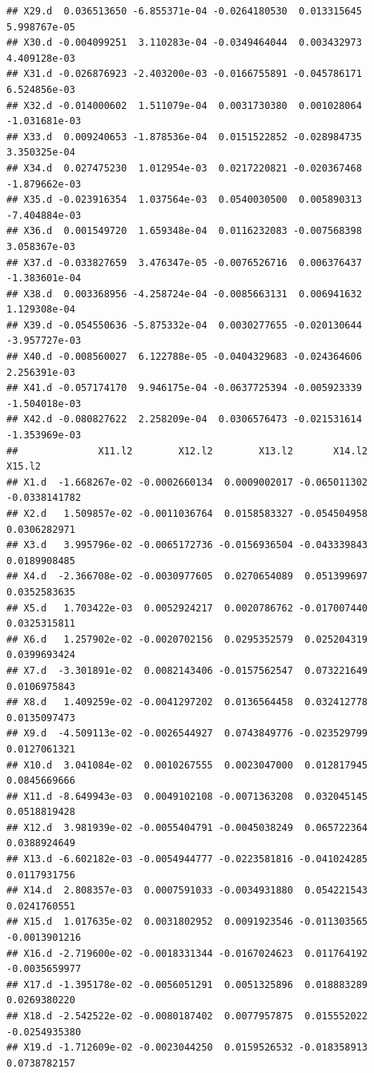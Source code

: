 \documentclass[]{article}
\begin{document}
\begin{verbatim}
## X29.d  0.036513650 -6.855371e-04 -0.0264180530  0.013315645  5.998767e-05
## X30.d -0.004099251  3.110283e-04 -0.0349464044  0.003432973  4.409128e-03
## X31.d -0.026876923 -2.403200e-03 -0.0166755891 -0.045786171  6.524856e-03
## X32.d -0.014000602  1.511079e-04  0.0031730380  0.001028064 -1.031681e-03
## X33.d  0.009240653 -1.878536e-04  0.0151522852 -0.028984735  3.350325e-04
## X34.d  0.027475230  1.012954e-03  0.0217220821 -0.020367468 -1.879662e-03
## X35.d -0.023916354  1.037564e-03  0.0540030500  0.005890313 -7.404884e-03
## X36.d  0.001549720  1.659348e-04  0.0116232083 -0.007568398  3.058367e-03
## X37.d -0.033827659  3.476347e-05 -0.0076526716  0.006376437 -1.383601e-04
## X38.d  0.003368956 -4.258724e-04 -0.0085663131  0.006941632  1.129308e-04
## X39.d -0.054550636 -5.875332e-04  0.0030277655 -0.020130644 -3.957727e-03
## X40.d -0.008560027  6.122788e-05 -0.0404329683 -0.024364606  2.256391e-03
## X41.d -0.057174170  9.946175e-04 -0.0637725394 -0.005923339 -1.504018e-03
## X42.d -0.080827622  2.258209e-04  0.0306576473 -0.021531614 -1.353969e-03
##              X11.l2        X12.l2        X13.l2       X14.l2        X15.l2
## X1.d  -1.668267e-02 -0.0002660134  0.0009002017 -0.065011302 -0.0338141782
## X2.d   1.509857e-02 -0.0011036764  0.0158583327 -0.054504958  0.0306282971
## X3.d   3.995796e-02 -0.0065172736 -0.0156936504 -0.043339843  0.0189908485
## X4.d  -2.366708e-02 -0.0030977605  0.0270654089  0.051399697  0.0352583635
## X5.d   1.703422e-03  0.0052924217  0.0020786762 -0.017007440  0.0325315811
## X6.d   1.257902e-02 -0.0020702156  0.0295352579  0.025204319  0.0399693424
## X7.d  -3.301891e-02  0.0082143406 -0.0157562547  0.073221649  0.0106975843
## X8.d   1.409259e-02 -0.0041297202  0.0136564458  0.032412778  0.0135097473
## X9.d  -4.509113e-02 -0.0026544927  0.0743849776 -0.023529799  0.0127061321
## X10.d  3.041084e-02  0.0010267555  0.0023047000  0.012817945  0.0845669666
## X11.d -8.649943e-03  0.0049102108 -0.0071363208  0.032045145  0.0518819428
## X12.d  3.981939e-02 -0.0055404791 -0.0045038249  0.065722364  0.0388924649
## X13.d -6.602182e-03 -0.0054944777 -0.0223581816 -0.041024285  0.0117931756
## X14.d  2.808357e-03  0.0007591033 -0.0034931880  0.054221543  0.0241760551
## X15.d  1.017635e-02  0.0031802952  0.0091923546 -0.011303565 -0.0013901216
## X16.d -2.719600e-02 -0.0018331344 -0.0167024623  0.011764192 -0.0035659977
## X17.d -1.395178e-02 -0.0056051291  0.0051325896  0.018883289  0.0269380220
## X18.d -2.542522e-02 -0.0080187402  0.0077957875  0.015552022 -0.0254935380
## X19.d -1.712609e-02 -0.0023044250  0.0159526532 -0.018358913  0.0738782157

\end{verbatim}
\end{document}
